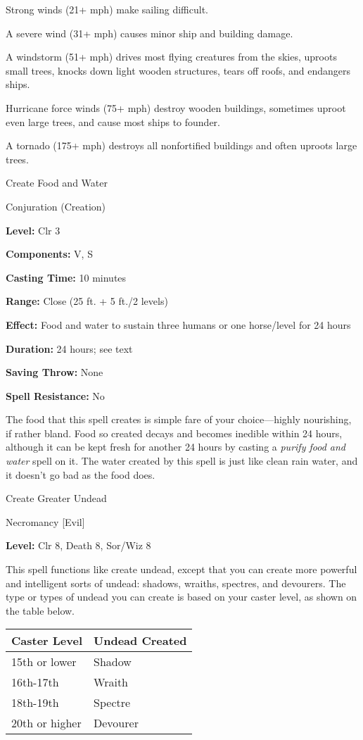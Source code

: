 \documentclass{article}
\begin{document}
Strong winds (21+ mph) make sailing difficult.

A severe wind (31+ mph) causes minor ship and building damage.

A windstorm (51+ mph) drives most flying creatures from the skies, uproots small 
trees, knocks down light wooden structures, tears off roofs, and endangers ships.

Hurricane force winds (75+ mph) destroy wooden buildings, sometimes uproot even 
large trees, and cause most ships to founder.

A tornado (175+ mph) destroys all nonfortified buildings and often uproots large 
trees.

\vspace{12pt}
Create Food and Water

Conjuration (Creation)

\textbf{Level:} Clr 3

\textbf{Components:} V, S

\textbf{Casting Time:} 10 minutes

\textbf{Range:} Close (25 ft. + 5 ft./2 levels)

\textbf{Effect:} Food and water to sustain three humans or one horse/level for 
24 hours

\textbf{Duration:} 24 hours; see text

\textbf{Saving Throw:} None

\textbf{Spell Resistance:} No

The food that this spell creates is simple fare of your choice---highly nourishing, 
if rather bland. Food so created decays and becomes inedible within 24 hours, although 
it can be kept fresh for another 24 hours by casting a \textit{purify food and 
water }spell on it. The water created by this spell is just like clean rain water, 
and it doesn't go bad as the food does.

\vspace{12pt}
Create Greater Undead

Necromancy [Evil]

\textbf{Level:} Clr 8, Death 8, Sor/Wiz 8

This spell functions like create undead, except that you can create more powerful 
and intelligent sorts of undead: shadows, wraiths, spectres, and devourers. The 
type or types of undead you can create is based on your caster level, as shown 
on the table below.

\begin{tabular}{|>{\raggedright}p{55pt}|>{\raggedright}p{69pt}|}
\hline
C\textbf{aster Level} & U\textbf{ndead Created}\tabularnewline
\hline
15th or lower & Shadow\tabularnewline
\hline
16th-17th & Wraith\tabularnewline
\hline
18th-19th & Spectre\tabularnewline
\hline
20th or higher & Devourer\tabularnewline
\hline
\end{tabular}
\end{document}
